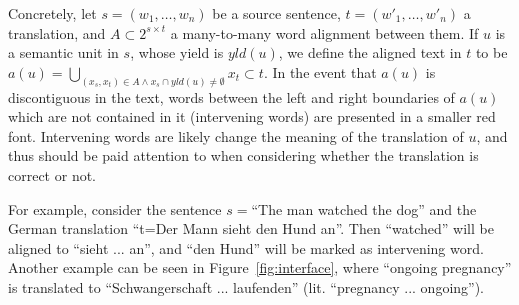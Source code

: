 \documentclass[11pt]{article}
\newcommand{\figref}[1]{Figure~\ref{#1}}
\newcommand{\bh}[1]{\footnote{\color{blue}BH: #1}}
\begin{document}
Concretely, let $s = (w_1,\ldots,w_n)$ be a source sentence, $t = (w'_1,\ldots,w'_n)$ a translation,
and $A \subset 2^{s \times t}$ a many-to-many word alignment between them.
If $u$ is a semantic unit in $s$, whose yield is $yld(u)$, we define the aligned text in
$t$ to be $a(u)=\bigcup_{(x_s,x_t) \in A \wedge x_s \cap yld(u) \neq \emptyset} x_t \subset t$.
In the event that $a(u)$ is discontiguous in the text, words between the left
and right boundaries of $a(u)$ which are not contained in it (intervening words)
are presented in a smaller red font.
Intervening words are likely change the meaning of the translation
of $u$, and thus should be paid attention to when considering whether the translation
is correct or not.

For example, consider the sentence $s=$``The man watched the dog'' and the German
translation ``t=Der Mann sieht den Hund an''. Then ``watched'' will be aligned to
``sieht ... an'', and ``den Hund'' will be marked as intervening word. Another example
can be seen in \figref{fig:interface}, where ``ongoing pregnancy'' is translated to
``Schwangerschaft ... laufenden'' (lit. ``pregnancy ... ongoing'').




\end{document}
